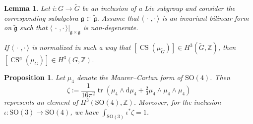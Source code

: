 \documentclass[10pt,a4paper]{amsart}
\newtheorem{lemma}{Lemma}
\newtheorem{prop}{Proposition}
\newcommand{\B}[2]{\langle#1,#2\rangle}
\newcommand{\CS}{\operatorname{CS}}
\newcommand{\Z}{\mathbb{Z}}
\newcommand{\col}{:}
\renewcommand*{\d}{\mathrm{d}}
\newcommand{\deq}{:=}
\renewcommand\frak{\mathfrak}
\newcommand{\tr}{\operatorname{tr}}
\newcommand{\x}{\times}
\begin{document}
\begin{lemma}\label{lem:CS-subgroup}
Let $i\col G\to\tilde G$ be an inclusion of a Lie subgroup and consider the corresponding
subalgebra $\frak{g}\subset\tilde{\frak{g}}$. Assume that $\B{\,\cdot\,}{\cdot\,}$ is an
invariant bilinear form on $\tilde{\frak{g}}$ such that $\B{\,\cdot\,}{\cdot\,}|_{\frak{g}\x\frak
g}$ is non-degenerate.

If $\B{\,\cdot\,}{\cdot\,}$ is normalized in such a way that $[\CS(\mu_{\tilde G})]\in
H^3(\tilde G,\Z)$, then $[\CS^{\frak{g}}(\mu_G)]\in H^3(G,\Z)$.
\end{lemma}

\begin{prop}\label{prop:normalization}
Let $\mu_4$ denote the Maurer--Cartan form of $\mathrm{SO}(4)$. Then
\begin{equation}\label{eqn:goodnorm}
\zeta\deq\frac{1}{16\pi^2}\tr\left(\mu_4\wedge \d
\mu_4+\tfrac{2}{3}\mu_4\wedge\mu_4\wedge\mu_4\right)
\end{equation}
represents an element of $H^3(\mathrm{SO}(4),\Z)$.  Moreover, for the
  inclusion $\iota:\mathrm{SO}(3)\to \mathrm{SO}(4)$, we have
  $\int_{\mathrm{SO}(3)}\iota^*\zeta=1$.
\end{prop}
\end{document}
